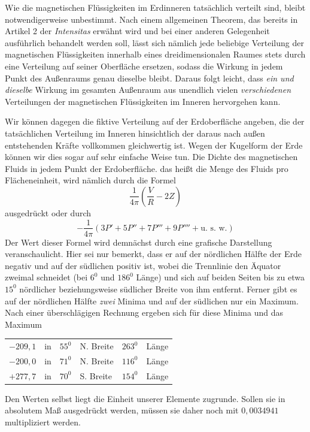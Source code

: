 Wie die magnetischen Flüssigkeiten im Erdinneren tatsächlich verteilt sind, bleibt notwendigerweise unbestimmt. Nach einem allgemeinen Theorem, das bereits in Artikel 2 der \textit{Intensitas} erwähnt wird und bei einer anderen Gelegenheit ausführlich behandelt werden soll, lässt sich nämlich jede beliebige Verteilung der magnetischen Flüssigkeiten innerhalb eines dreidimensionalen Raumes stets durch eine Verteilung auf seiner Oberfläche ersetzen, sodass die Wirkung in jedem Punkt des Außenraums genau dieselbe bleibt. Daraus folgt leicht, dass \textit{ein und dieselbe} Wirkung im gesamten Außenraum aus unendlich vielen \textit{verschiedenen} Verteilungen der magnetischen Flüssigkeiten im Inneren hervorgehen kann.

Wir können dagegen die fiktive Verteilung auf der Erdoberfläche angeben, die der tatsächlichen Verteilung im Inneren hinsichtlich der daraus nach außen entstehenden Kräfte vollkommen gleichwertig ist. Wegen der Kugelform der Erde können wir dies sogar auf sehr einfache Weise tun. Die Dichte des magnetischen Fluids in jedem Punkt der Erdoberfläche. das heißt die Menge des Fluids pro Flächeneinheit, wird nämlich durch die Formel
\[
\frac1{4\pi}(\frac VR-2Z)
\]
ausgedrückt oder durch
\[
-\frac1{4\pi}(3P'+5P''+7P'''+9P''''+\text{u. s. w.})
\]
Der Wert dieser Formel wird demnächst durch eine grafische Darstellung veranschaulicht. Hier sei nur bemerkt, dass er auf der nördlichen Hälfte der Erde negativ und auf der südlichen positiv ist, wobei die Trennlinie den Äquator zweimal schneidet (bei $6^0$ und $186^0$ Länge) und sich auf beiden Seiten bis zu etwa $15^0$ nördlicher beziehungsweise südlicher Breite von ihm entfernt. Ferner gibt es auf der nördlichen Hälfte \textit{zwei} Minima und auf der südlichen nur ein Maximum. Nach einer überschlägigen Rechnung ergeben sich für diese Minima und das Maximum
\begin{center}
\begin{tabular}{rlrlrl}
$-209{,}1$&in&$55^0$&N. Breite&$263^0$&Länge\\
$-200{,}0$&in&$71^0$&N. Breite&$116^0$&Länge\\
$+277{,}7$&in&$70^0$&S. Breite&$154^0$&Länge
\end{tabular}
\end{center}
Den Werten selbst liegt die Einheit unserer Elemente zugrunde. Sollen sie in absolutem Maß ausgedrückt werden, müssen sie daher noch mit $0{,}0034941$ multipliziert werden.

